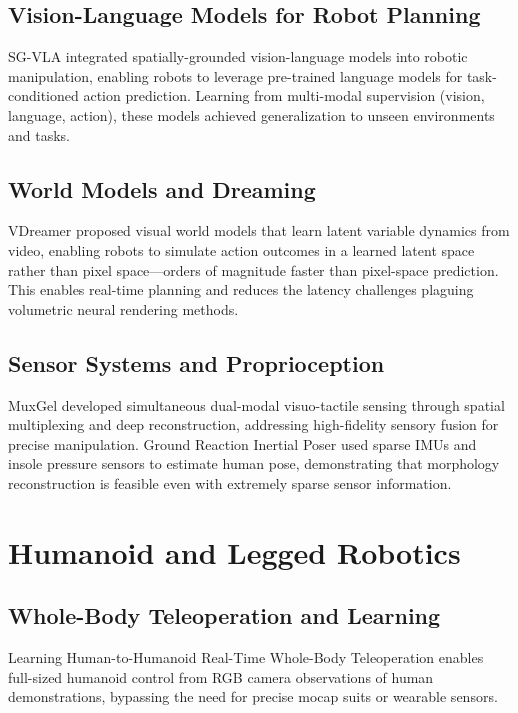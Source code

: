 \documentclass[journal]{IEEEtran}
\begin{document}
\subsection{Vision-Language Models for Robot Planning}

SG-VLA \cite{sgvla2026} integrated spatially-grounded vision-language models into robotic manipulation, enabling robots to leverage pre-trained language models for task-conditioned action prediction. Learning from multi-modal supervision (vision, language, action), these models achieved generalization to unseen environments and tasks.

\subsection{World Models and Dreaming}

VDreamer \cite{vdreamer2024} proposed visual world models that learn latent variable dynamics from video, enabling robots to simulate action outcomes in a learned latent space rather than pixel space—orders of magnitude faster than pixel-space prediction. This enables real-time planning and reduces the latency challenges plaguing volumetric neural rendering methods.

\subsection{Sensor Systems and Proprioception}

MuxGel \cite{muxgel2025} developed simultaneous dual-modal visuo-tactile sensing through spatial multiplexing and deep reconstruction, addressing high-fidelity sensory fusion for precise manipulation. Ground Reaction Inertial Poser \cite{griposer2026} used sparse IMUs and insole pressure sensors to estimate human pose, demonstrating that morphology reconstruction is feasible even with extremely sparse sensor information.

\section{Humanoid and Legged Robotics}

\subsection{Whole-Body Teleoperation and Learning}

Learning Human-to-Humanoid Real-Time Whole-Body Teleoperation \cite{humtohuman2025} enables full-sized humanoid control from RGB camera observations of human demonstrations, bypassing the need for precise mocap suits or wearable sensors.
\end{document}
